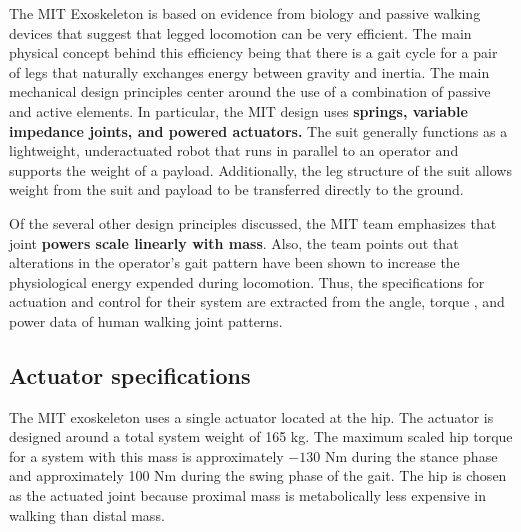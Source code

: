 \begin{refsection}

The MIT Exoskeleton is based on evidence from biology and passive walking devices that suggest that legged locomotion can be very efficient.  The main physical concept behind this efficiency being that there is a gait cycle for a pair of legs that naturally exchanges energy between gravity and inertia.  The main mechanical design principles center around the use of a combination of passive and active elements.  In particular, the MIT design uses {\bf springs, variable impedance joints, and powered actuators.}  The suit generally  functions as a lightweight, underactuated robot that runs in parallel to an operator and supports the weight of a payload. Additionally, the leg structure of the suit allows weight from the suit and payload to be transferred directly to the ground.

Of the several other design principles discussed, the MIT team emphasizes that joint {\bf powers scale linearly with mass}.  Also, the team points out that alterations in the operator's gait pattern have been shown to increase the physiological energy expended during locomotion.  Thus, the specifications for actuation and control for their system are extracted from the angle, torque , and power data of human walking joint patterns.     


\subsection{Actuator specifications}

The MIT exoskeleton uses a single actuator located at the hip.  The actuator is designed around a total system weight of 165 kg.  The maximum scaled hip torque for a system with this mass is approximately $-130$ Nm during the stance phase and approximately 100 Nm during the swing phase of the gait.  The hip is chosen as the actuated joint because proximal mass is metabolically less expensive in walking than distal mass.


\end{refsection}
